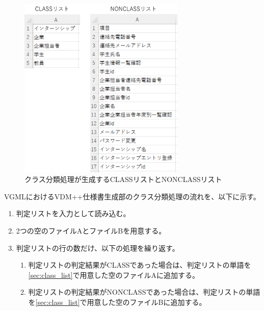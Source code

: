 \begin{figure}[t]
    \begin{center}
        \includegraphics[width=300]{image/class_nonclass_list.png}
        \caption{クラス分類処理が生成するCLASSリストとNONCLASSリスト}
        \label{fig:class_nonclass_list}
    \end{center}
\end{figure}

VGMLにおけるVDM++仕様書生成部のクラス分類処理の流れを、以下に示す。

\begin{enumerate}
    \item 判定リストを入力として読み込む。
    \item 2つの空のファイルAとファイルBを用意する。
    \label{sec:class_list}
    \item 判定リストの行の数だけ、以下の処理を繰り返す。
        \begin{enumerate}
            \item 判定リストの判定結果がCLASSであった場合は、判定リストの単語を\ref{sec:class_list}で用意した空のファイルAに追加する。
            \item 判定リストの判定結果がNONCLASSであった場合は、判定リストの単語を\ref{sec:class_list}で用意した空のファイルBに追加する。
        \end{enumerate}
\end{enumerate}

